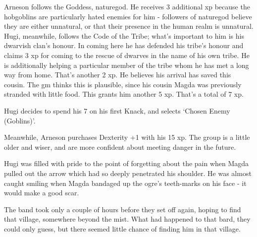 \begin{exampletext}
Arneson follows the Goddess, \gls{naturegod}.
He receives 3 additional \gls{xp} because the hobgoblins are particularly hated enemies for him - followers of \gls{naturegod} believe they are either unnatural, or that their presence in the human realm is unnatural.
Hugi, meanwhile, follows the Code of the Tribe; what's important to him is his dwarvish clan's honour.
In coming here he has defended his tribe's honour and claims 3 \gls{xp} for coming to the rescue of dwarves in the name of his own tribe.
He is additionally helping a particular member of the tribe whom he has met a long way from home.
That's another 2 \gls{xp}.
He believes his arrival has saved this cousin.
The \gls{gm} thinks this is plausible, since his cousin Magda was previously stranded with little food.
This grants him another 5 \gls{xp}.
That's a total of 7 \gls{xp}.

Hugi decides to spend his 7 on his first Knack, and selects `Chosen Enemy (Goblins)'.

Meanwhile, Arneson purchases Dexterity +1 with his 15 \gls{xp}. The group is a little older and wiser, and are more confident about meeting danger in the future.

Hugi was filled with pride to the point of forgetting about the pain when Magda pulled out the arrow which had so deeply penetrated his shoulder. He was almost caught smiling when Magda bandaged up the ogre's teeth-marks on his face - it would make a good scar.

The band took only a couple of hours before they set off again, hoping to find that village, somewhere beyond the mist. What had happened to that bard, they could only guess, but there seemed little chance of finding him in that village.

\end{exampletext}

